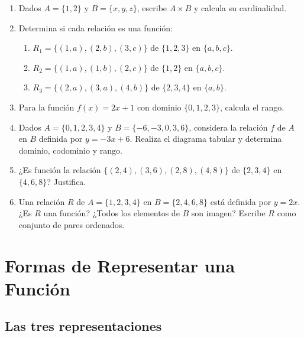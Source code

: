 \documentclass[12pt, letterpaper]{article}
\begin{document}
\begin{enumerate}[leftmargin=*, resume]
  \item \facil{} Dados $A = \{1, 2\}$ y $B = \{x, y, z\}$, escribe $A \times B$ y calcula su cardinalidad.

  \item \facil{} Determina si cada relación es una función:
        \begin{enumerate}[label=\alph*)]
          \item $R_1 = \{(1, a), (2, b), (3, c)\}$ de $\{1,2,3\}$ en $\{a,b,c\}$.
          \item $R_2 = \{(1, a), (1, b), (2, c)\}$ de $\{1,2\}$ en $\{a,b,c\}$.
          \item $R_3 = \{(2, a), (3, a), (4, b)\}$ de $\{2,3,4\}$ en $\{a,b\}$.
        \end{enumerate}

  \item \facil{} Para la función $f(x) = 2x + 1$ con dominio $\{0, 1, 2, 3\}$, calcula el rango.

  \item \medio{} Dados $A = \{0, 1, 2, 3, 4\}$ y $B = \{-6, -3, 0, 3, 6\}$, considera la relación $f$ de $A$ en $B$ definida por $y = -3x + 6$. Realiza el diagrama tabular y determina dominio, codominio y rango.

  \item \medio{} ¿Es función la relación $\{(2, 4), (3, 6), (2, 8), (4, 8)\}$ de $\{2, 3, 4\}$ en $\{4, 6, 8\}$? Justifica.

  \item \dificil{} Una relación $R$ de $A = \{1, 2, 3, 4\}$ en $B = \{2, 4, 6, 8\}$ está definida por $y = 2x$. ¿Es $R$ una función? ¿Todos los elementos de $B$ son imagen? Escribe $R$ como conjunto de pares ordenados.
\end{enumerate}

\section{Formas de Representar una Función}

\subsection{Las tres representaciones}
\end{document}
